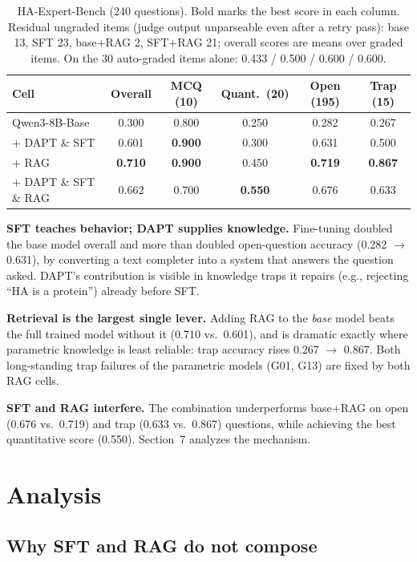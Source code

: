 \documentclass[11pt]{article}
\begin{document}
\begin{table}[t]
\centering
\begin{tabular}{lccccc}
\toprule
Cell & Overall & MCQ (10) & Quant.\ (20) & Open (195) & Trap (15) \\
\midrule
Qwen3-8B-Base        & 0.300 & 0.800 & 0.250 & 0.282 & 0.267 \\
+ DAPT \& SFT        & 0.601 & \textbf{0.900} & 0.300 & 0.631 & 0.500 \\
+ RAG                & \textbf{0.710} & \textbf{0.900} & 0.450 & \textbf{0.719} & \textbf{0.867} \\
+ DAPT \& SFT \& RAG & 0.662 & 0.700 & \textbf{0.550} & 0.676 & 0.633 \\
\bottomrule
\end{tabular}
\caption{HA-Expert-Bench (240 questions). Bold marks the best score in
each column. Residual ungraded items (judge output unparseable even after
a retry pass): base 13, SFT 23, base+RAG 2, SFT+RAG 21; overall scores are
means over graded items. On the 30 auto-graded items alone:
0.433 / 0.500 / 0.600 / 0.600.}
\label{tab:main}
\end{table}

\textbf{SFT teaches behavior; DAPT supplies knowledge.} Fine-tuning
doubled the base model overall and more than doubled open-question
accuracy (0.282 $\rightarrow$ 0.631), by converting a text completer into
a system that answers the question asked. DAPT's contribution is visible
in knowledge traps it repairs (e.g., rejecting ``HA is a protein'') already
before SFT.

\textbf{Retrieval is the largest single lever.} Adding RAG to the
\emph{base} model beats the full trained model without it (0.710 vs.\
0.601), and is dramatic exactly where parametric knowledge is least
reliable: trap accuracy rises 0.267 $\rightarrow$ 0.867. Both long-standing
trap failures of the parametric models (G01, G13) are fixed by both RAG
cells.

\textbf{SFT and RAG interfere.} The combination underperforms base+RAG on
open (0.676 vs.\ 0.719) and trap (0.633 vs.\ 0.867) questions, while
achieving the best quantitative score (0.550). Section~7 analyzes the
mechanism.

\section{Analysis}

\subsection{Why SFT and RAG do not compose}
\end{document}
